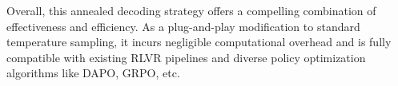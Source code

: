 %
Overall, this annealed decoding strategy offers a compelling combination of effectiveness and efficiency. As a plug-and-play modification to standard temperature sampling, it incurs negligible computational overhead and is fully compatible with existing RLVR pipelines and diverse policy optimization algorithms like DAPO, GRPO, etc.


